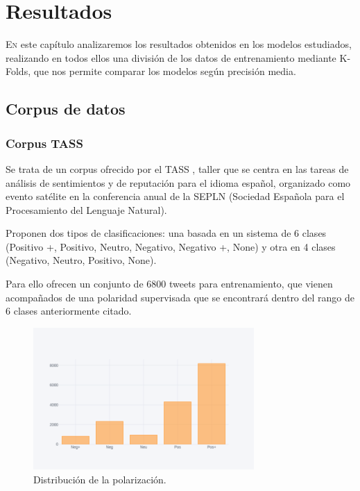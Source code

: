 
\chapter{Resultados}

\lettrine{E}{n} este capítulo analizaremos los resultados obtenidos en los modelos estudiados, realizando en todos ellos una división de los datos de entrenamiento mediante K-Folds, que nos permite comparar los modelos según precisión media.

\section{Corpus de datos}\label{corpus}

\subsection{Corpus TASS}
Se trata de un corpus ofrecido por el TASS , taller que se centra en las tareas de análisis de sentimientos y de reputación para el idioma español, organizado como evento satélite en la conferencia anual de la SEPLN (Sociedad Española para el Procesamiento del Lenguaje Natural).

Proponen dos tipos de clasificaciones: una basada en un sistema de 6 clases (Positivo +, Positivo, Neutro, Negativo, Negativo +, None) y otra en 4 clases (Negativo, Neutro, Positivo, None).

Para ello ofrecen un conjunto de 6800 tweets para entrenamiento, que vienen acompañados de una polaridad supervisada que se encontrará dentro del rango de 6 clases anteriormente citado.

\begin{figure}[!ht]
	\centering
	\includegraphics[width=0.75\textwidth]{imaxes/distTass.png}
	\caption{Distribución de la polarización.}
	\label{dist_tass}
\end{figure}


